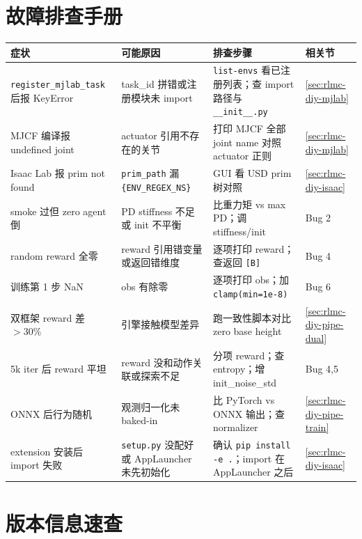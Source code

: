 \section{故障排查手册}
\label{sec:rlmc-diy-trouble}

\begin{center}
\small
\begin{tabular}{@{}p{4.0cm}p{3.6cm}p{4.2cm}l@{}}
\toprule
症状 & 可能原因 & 排查步骤 & 相关节 \\
\midrule
\verb|register_mjlab_task| 后报 KeyError & task\_id 拼错或注册模块未 import & \verb|list-envs| 看已注册列表；查 import 路径与 \verb|__init__.py| & \cref{sec:rlmc-diy-mjlab} \\
MJCF 编译报 undefined joint & actuator 引用不存在的关节 & 打印 MJCF 全部 joint name 对照 actuator 正则 & \cref{sec:rlmc-diy-mjlab} \\
Isaac Lab 报 prim not found & \verb|prim_path| 漏 \verb|{ENV_REGEX_NS}| & GUI 看 USD prim 树对照 & \cref{sec:rlmc-diy-isaac} \\
smoke 过但 zero agent 倒 & PD stiffness 不足或 init 不平衡 & 比重力矩 vs max PD；调 stiffness/init & Bug 2 \\
random reward 全零 & reward 引用错变量或返回错维度 & 逐项打印 reward；查返回 \verb|[B]| & Bug 4 \\
训练第 1 步 NaN & obs 有除零 & 逐项打印 obs；加 \verb|clamp(min=1e-8)| & Bug 6 \\
双框架 reward 差 $>30\%$ & 引擎接触模型差异 & 跑一致性脚本对比 zero base height & \cref{sec:rlmc-diy-pipe-dual} \\
5k iter 后 reward 平坦 & reward 没和动作关联或探索不足 & 分项 reward；查 entropy；增 init\_noise\_std & Bug 4,5 \\
ONNX 后行为随机 & 观测归一化未 baked-in & 比 PyTorch vs ONNX 输出；查 normalizer & \cref{sec:rlmc-diy-pipe-train} \\
extension 安装后 import 失败 & \verb|setup.py| 没配好或 AppLauncher 未先初始化 & 确认 \verb|pip install -e .|；import 在 AppLauncher 之后 & \cref{sec:rlmc-diy-isaac} \\
\bottomrule
\end{tabular}
\end{center}

\section{版本信息速查}
\label{sec:rlmc-diy-versions}

